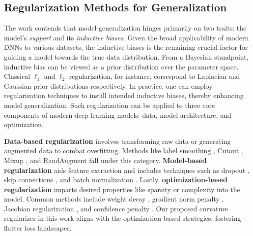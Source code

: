 \documentclass[letterpaper]{article} %
\theoremstyle{plain}
\theoremstyle{definition}
\begin{document}
\subsection{Regularization Methods for Generalization}
\label{subsec:regularization}
The work \cite{NEURIPS2020_322f6246} contends that model generalization hinges primarily on two traits: the model's \emph{support} and its \emph{inductive biases}. Given the broad applicability of modern DNNs to various datasets, the inductive biases is the remaining crucial factor for guiding a model towards the true data distribution. From a Bayesian standpoint, inductive bias can be viewed as a prior distribution over the parameter space. Classical $\ell_1$ and $\ell_2$ regularization, for instance, correspond to Laplacian and Gaussian prior distributions respectively. In practice, one can employ regularization techniques to instill intended inductive biases, thereby enhancing model generalization. Such regularization can be applied to three core components of modern deep learning models: data, model architecture, and optimization.

{\bf Data-based regularization} involves transforming raw data or generating augmented data to combat overfitting. Methods like label smoothing \cite{szegedy2016rethinking}, Cutout \cite{devries2017improved}, Mixup \cite{zhang2017mixup}, and RandAugment \cite{cubuk2020randaugment} fall under this category. {\bf Model-based regularization} aids feature extraction and includes techniques such as dropout \cite{srivastava2014dropout}, skip connections \cite{he2016deep}, and batch normalization \cite{ioffe2015batch}. Lastly, {\bf optimization-based regularization} imparts desired properties like sparsity or complexity into the model. Common methods include weight decay \cite{krogh1991simple}, gradient norm penalty \cite{drucker1992improving, zhao2022penalizing}, Jacobian regularization \cite{sokolic2017robust}, and confidence penalty \cite{pereyra2017regularizing}. Our proposed curvature regularizer in this work aligns with the optimization-based strategies, fostering flatter loss landscapes.
\end{document}
